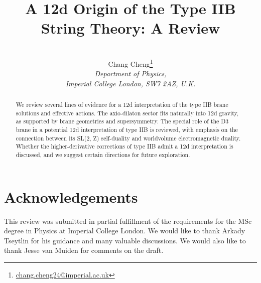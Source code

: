 \documentclass[11pt]{article}
\title{A 12d Origin of the Type IIB String Theory: A Review}
\author{
\\[2pt]
\large{Chang Cheng}\footnote{\href{mailto:chang.cheng24@imperial.ac.uk}{chang.cheng24@imperial.ac.uk}} 
\\[10pt]
\it{Department of Physics,}\\
\it{Imperial College London, SW7 2AZ, U.K.}
\\[2pt]
}
\date{}
\begin{document}
\maketitle



\begin{abstract}
We review several lines of evidence for a 12d interpretation of the type IIB brane solutions and effective actions.
The axio-dilaton sector fits naturally into 12d gravity, as supported by brane geometries and supersymmetry.
The special role of the D3 brane in a potential 12d interpretation of type IIB is reviewed, with emphasis on the connection between its SL(2, Z) self-duality and worldvolume electromagnetic duality.
Whether the higher-derivative corrections of type IIB admit a 12d interpretation is discussed, and we suggest certain directions for future exploration.
\end{abstract}
\tableofcontents











\section{Acknowledgements}
This review was submitted in partial fulfillment of the requirements for the MSc degree in Physics at Imperial College London.
We would like to thank Arkady Tseytlin for his guidance and many valuable discussions.
We would also like to thank Jesse van Muiden for comments on the draft. 

\newpage
\appendix




\printbibliography
\end{document}
